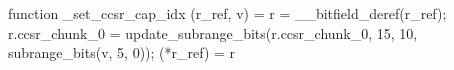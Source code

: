 function _set_ccsr_cap_idx (r_ref, v) = {
    r = __bitfield_deref(r_ref);
    r.ccsr_chunk_0 = update_subrange_bits(r.ccsr_chunk_0, 15, 10, subrange_bits(v, 5, 0));
    (*r_ref) = r
}
